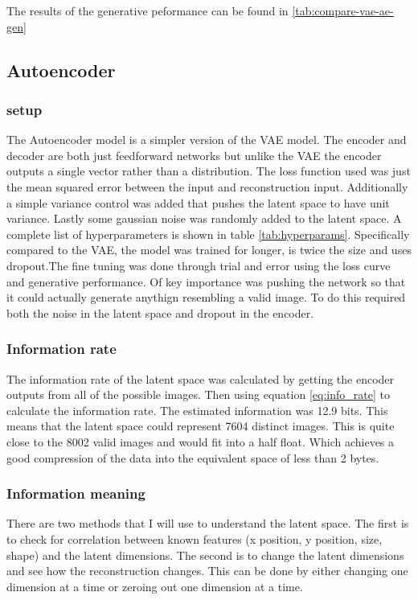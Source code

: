 \documentclass[conference,a4paper]{IEEEtran}
\begin{document}
The results of the generative peformance can be found in \ref{tab:compare-vae-ae-gen}

\subsection{Autoencoder}

\subsubsection{setup}

The Autoencoder model is a simpler version of the VAE model. The encoder and decoder are both just feedforward networks but unlike the VAE the encoder outputs a single vector rather than a distribution. The loss function used was just the mean squared error between the input and reconstruction input. Additionally a simple variance control was added that pushes the latent space to have unit variance. Lastly some gaussian noise was randomly added to the latent space. A complete list of hyperparameters is shown in table \ref{tab:hyperparams}. Specifically compared to the VAE, the model was trained for longer, is twice the size and uses dropout.The fine tuning was done through trial and error using the loss curve and generative performance. Of key importance was pushing the network so that it could actually generate anythign resembling a valid image. To do this required both the noise in the latent space and dropout in the encoder.

\subsubsection{Information rate}

The information rate of the latent space was calculated by getting the encoder outputs from all of the possible images. Then using equation \ref{eq:info_rate} to calculate the information rate. The estimated information was 12.9 bits. This means that the latent space could represent 7604 distinct images. This is quite close to the 8002 valid images and would fit into a half float. Which achieves a good compression of the data into the equivalent space of less than 2 bytes.

\subsubsection{Information meaning}

There are two methods that I will use to understand the latent space. The first is to check for correlation between known features (x position, y position, size, shape) and the latent dimensions. The second is to change the latent dimensions and see how the reconstruction changes. This can be done by either changing one dimension at a time or zeroing out one dimension at a time.
\end{document}
